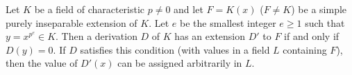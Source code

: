 Let $K$ be a field of characteristic $p \neq 0$ and let $F = K(x)$ ($F \neq K$) be a simple purely inseparable extension of $K$. Let $e$ be the smallest integer $e \geq 1$ such that $y = x^{p^e} \in K$. Then a derivation $D$ of $K$ has an extension $D'$ to $F$ if and only if $D(y) = 0$. If $D$ satisfies this condition (with values in a field $L$ containing $F$), then the value of $D'(x)$ can be assigned arbitrarily in $L$.
